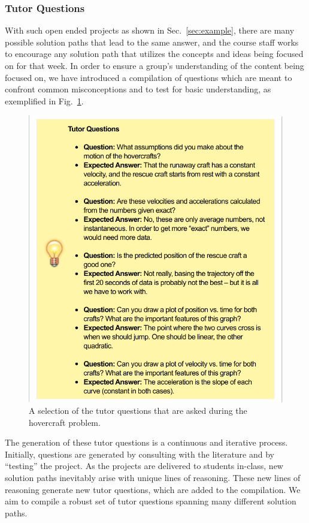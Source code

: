 \documentclass{msuphddissertation}
\begin{document}
\begin{doublespace}
\subsubsection{Tutor Questions}

With such open ended projects as shown in Sec.~\ref{sec:example}, there are many possible solution paths that lead to the same answer, and the course staff works to encourage any solution path that utilizes the concepts and ideas being focused on for that week.  In order to ensure a group's understanding of the content being focused on, we have introduced a compilation of questions which are meant to confront common misconceptions and to test for basic understanding, as exemplified in Fig.~\ref{fig:tutorq}.

\begin{figure}
\centering
\includegraphics[width=1\linewidth]{./images/tutorq.pdf}
\caption{A selection of the tutor questions that are asked during the hovercraft problem.}\label{fig:tutorq}
\end{figure}

The generation of these tutor questions is a continuous and iterative process.  Initially, questions are generated by consulting with the literature and by ``testing'' the project.  As the projects are delivered to students in-class, new solution paths inevitably arise with unique lines of reasoning.  These new lines of reasoning generate new tutor questions, which are added to the compilation.  We aim to compile a robust set of tutor questions spanning many different solution paths.


\end{doublespace}
\end{document}
